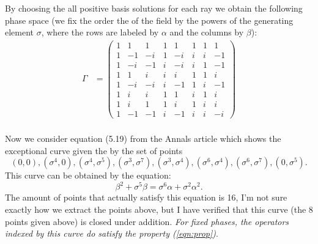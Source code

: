 \documentclass[a4paper]{article}
\begin{document}
  By choosing the all positive basis solutions for each ray
  we obtain the following phase space (we fix the order the
  of the field by the powers of the generating element
  $\sigma$, where the rows are labeled by $\alpha$ and the
  columns by $\beta$):
  \begin{align}
    \Gamma
    &=
    \displaystyle \left(\begin{array}{rrrrrrrr}
    1 & 1 & 1 & 1 & 1 & 1 & 1 & 1 \\
    1 & -1 & -i & 1 & -i & i & i & -1 \\
    1 & -i & -1 & i & -i & i & 1 & -1 \\
    1 & 1 & i & i & i & 1 & 1 & i \\
    1 & -i & -i & i & -1 & 1 & i & -1 \\
    1 & i & i & 1 & 1 & i & 1 & i \\
    1 & i & 1 & 1 & i & 1 & i & i \\
    1 & -1 & -1 & i & -1 & i & i & -i
    \end{array}\right) \\
  \end{align}

  Now we consider equation (5.19) from the Annals article
  which shows the exceptional curve given the by the set of
  points
  \begin{equation}
    (0,0), (\sigma^4,0), (\sigma^4, \sigma^5), (\sigma^3,
    \sigma^7), (\sigma^3, \sigma^4), (\sigma^6, \sigma^4),
    (\sigma^6, \sigma^7), (0, \sigma^5).
  \end{equation}
  This curve can be obtained by the equation:
  \begin{equation}
    \beta^2 + \sigma^5 \beta
    = \sigma^6 \alpha + \sigma^2 \alpha^2.
  \end{equation}
  The amount of points that actually satisfy this equation
  is 16, I'm not sure exactly how we extract the points
  above, but I have verified that this curve (the 8 points
  given above) is closed under addition. \textit{For fixed
  phases, the operators indexed by this curve do satisfy the
property (\ref{eqn:prop})}.
\end{document}
